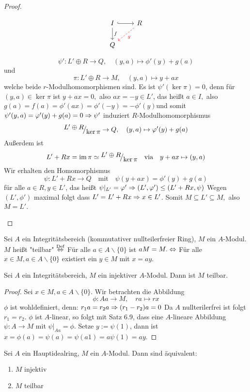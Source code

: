 \begin{proof}
\begin{enumerate}
\begin{minipage}[t]{0.7\textwidth}
		\end{minipage}
		\begin{minipage}[t]{0.3\textwidth} 
			$$\begin{tikzcd}
			I \arrow[hook]{r} \arrow{d}{f}& R \arrow[dashed,red]{dl}{g}\\ Q &
			\end{tikzcd}$$
		\end{minipage}
	 $$\psi': L' \oplus R \to Q,\quad (y,a) \mapsto \phi'(y) + g(a) $$
	und 
	$$\pi: L' \oplus R \to M,\quad(y,a) \mapsto y +ax$$
		welche beide $r$-Modulhomomorphismen sind. Es ist $\psi'(\ker\pi) = 0$, denn für $(y,a) \in \ker\pi$ ist $ y+ax=0,$ also $ax=-y \in L'$, das heißt $a \in I,$ also $g(a)=f(a)=\phi'(ax)=\phi'(-y) = -\phi'(y) $und somit $\psi'(y,a) = \varphi'(y)+g(a) = 0 \Rightarrow \psi'$ induziert $R$-Modulhomomorphismus $$\QR{L' \oplus R}{\ker\pi} \to Q, \quad(y,a) \mapsto \phi'(y)+g(a)$$
		 Außerdem ist $$L'+Rx = \im\pi \simeq \QR{L' \oplus R}{\ker\pi} \quad \text{via}\quad y+ax \mapsto (y,a)$$
		 Wir erhalten den Homomorphismus $$\psi:L'+Rx \to Q \quad \text{mit} \quad\psi(y+ax) = \phi'(y)+g(a) $$ für alle $a \in R, y \in L' $, das heißt $\psi|_{L'} = \varphi' \Rightarrow (L',\varphi') \leq (L'+Rx, \psi) $ Wegen $(L',\phi') $ maximal folgt dass $ L'=L'+Rx \Rightarrow x \in L' $. Somit $M \subseteq L' \subseteq M, $ also $M = L'$.
	\end{enumerate}
\end{proof}
\begin{df}
	Sei $A$ ein Integritätsbereich (kommutativer nullteilerfreier Ring), $M$ ein $A$-Modul. $M$ heißt "teilbar" $\overset{\text{Def}}{\Leftrightarrow}$ Für alle $a\in A \backslash \{0\}$ ist $ aM=M. \Leftrightarrow$ Für alle $x \in M, a \in A \backslash \{0\}$ existiert ein $y\in M $ mit $x=ay$.
\end{df}
\begin{bem}
	Sei $A$ ein Integritätsbereich, $M$ ein injektiver $A$-Modul. Dann ist $M$ teilbar.
\end{bem}
\begin{proof}
	Sei $x \in M , a \in A \backslash \{0\}$. Wir betrachten die Abbildung $$\phi: Aa \to M, \quad ra \mapsto rx$$ $\phi$ ist wohldefiniert, denn: $ r_1a= r_2a \Rightarrow (r_1-r_2)a =0 $ Da $A$ nullterilerfrei ist folgt $r_1=r_2 $. $ \phi$ ist $A$-linear, so folgt mit Satz 6.9, dass eine $A$-lineare Abbildung $\psi: A \to M $ mit $\psi|_{Aa} = \phi$. Setze $y:= \psi(1)$, dann ist $ x = \phi(a)=\psi(a) = \psi(a 1) = a\psi(1)=ay.$
\end{proof}
\begin{bem}
	Sei $A$ ein Hauptidealring, $M$ ein $A$-Modul. Dann sind äquivalent: 
	\begin{enumerate} [label= \roman*)]
		\item $M$ injektiv 
		\item $M$ teilbar 
	\end{enumerate}
\end{bem}
